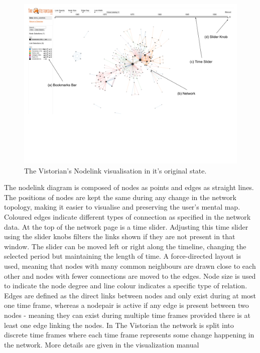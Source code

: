 \begin{figure}[h!]
  \begin{center}
  \includegraphics[trim={0 10cm 0 0}, width=140mm]{./Figures/vistorianOriginal.png}
  \caption{The Vistorian's Nodelink visualisation in it's original state.}
  \label{fig:vistorianOriginal}
  \end{center}
\end{figure}

The nodelink diagram is composed of nodes as points and edges as straight lines. The positions of nodes are kept the same during any change in the network topology, making it easier to visualise \cite{tsotaivg} and preserving the user's mental map\cite{tmitmmeridgd}. Coloured edges indicate different types of connection as specified in the network data.
At the top of the network page is a time slider. Adjusting this time slider using the slider knobs filters the links shown if they are not present in that window. The slider can be moved left or right along the timeline, changing the selected period but maintaining the length of time. A force-directed layout is used, meaning that nodes with many common neighbours are drawn close to each other and nodes with fewer connections are moved to the edges. Node size is used to indicate the node degree and line colour indicates a specific type of relation. Edges are defined as the direct links between nodes and only exist during at most one time frame, whereas a nodepair is active if any edge is present between two nodes - meaning they can exist during multiple time frames provided there is at least one edge linking the nodes. In The Vistorian the network is split into discrete time frames where each time frame represents some change happening in the network.
More details are given in the visualization manual \cite{vismanual}

